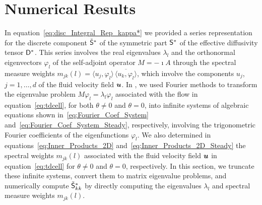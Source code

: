 \documentclass[amsa]{ipart}
\begin{document}
\section{Numerical Results}\label{sec:Num_Results}
%
In equation~\eqref{eq:disc_Integral_Rep_kappa*} we provided a series
representation for the discrete component $\tilde{\mathsf{S}}^*$ of the
symmetric part $\mathsf{S}^*$ of the effective diffusivity tensor
$\mathsf{D}^*$. This series involves 
the real eigenvalues $\lambda_l$ and the orthonormal eigenvectors $\varphi_l$ of
the self-adjoint operator $M=-\imath A$ through the spectral measure weights
$m_{jk}(l)=\langle u_j,\varphi_l\rangle\,\overline{\langle u_k,\varphi_l\rangle}$, which involve the
components $u_j$, $j=1,\ldots,d$ of the fluid velocity field $\boldsymbol{u}$. In
, we used Fourier methods to transform the
eigenvalue problem $M\varphi_l=\lambda_l\varphi_l$ associated with the flow in
equation~\eqref{eq:tdcell}, for both $\theta\neq0$ and $\theta=0$, into infinite
systems  
of algebraic equations shown in~\eqref{eq:Fourier_Coef_System}
and~\eqref{eq:Fourier_Coef_System_Steady}, respectively, involving the
trigonometric Fourier coefficients of the eigenfunctions $\varphi_l$. We
also determined in equations~\eqref{eq:Inner_Products_2D}   
and~\eqref{eq:Inner_Products_2D_Steady} the spectral weights
$m_{jk}(l)$ associated with the fluid velocity field $\boldsymbol{u}$ in
equation~\eqref{eq:tdcell} for $\theta\neq0$ and $\theta=0$, respectively.  In this
section, we 
truncate these infinite systems, convert them to matrix eigenvalue
problems, and numerically compute $\tilde{\mathsf{S}}^*_{kk}$ by
directly computing the eigenvalues $\lambda_l$ and spectral measure weights 
$m_{jk}(l)$.  
\end{document}
